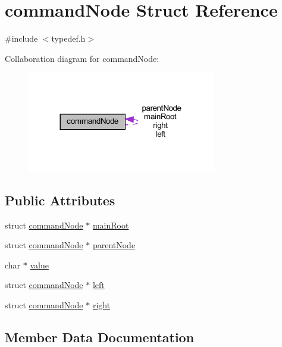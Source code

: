 \hypertarget{structcommandNode}{}\section{command\+Node Struct Reference}
\label{structcommandNode}


{\ttfamily \#include $<$typedef.\+h$>$}



Collaboration diagram for command\+Node\+:\nopagebreak
\begin{figure}[H]
\begin{center}
\leavevmode
\includegraphics[width=233pt]{structcommandNode__coll__graph}
\end{center}
\end{figure}
\subsection*{Public Attributes}
\begin{DoxyCompactItemize}
\item 
struct \mbox{\hyperlink{structcommandNode}{command\+Node}} $\ast$ \mbox{\hyperlink{structcommandNode_a92f8c627edb51c5ff72e25d8e50c7a2c}{main\+Root}}
\item 
struct \mbox{\hyperlink{structcommandNode}{command\+Node}} $\ast$ \mbox{\hyperlink{structcommandNode_a51770f48c99c29a08b34477d9bd0c164}{parent\+Node}}
\item 
char $\ast$ \mbox{\hyperlink{structcommandNode_a64d65c9b57488418cd5c8e3def5dcbcf}{value}}
\item 
struct \mbox{\hyperlink{structcommandNode}{command\+Node}} $\ast$ \mbox{\hyperlink{structcommandNode_a2a5389004cffb434d719761a50ccf60e}{left}}
\item 
struct \mbox{\hyperlink{structcommandNode}{command\+Node}} $\ast$ \mbox{\hyperlink{structcommandNode_a66f09364fe9dedd129473880c8e65e44}{right}}
\end{DoxyCompactItemize}


\subsection{Member Data Documentation}
\mbox{\label{structcommandNode_a2a5389004cffb434d719761a50ccf60e}} 
